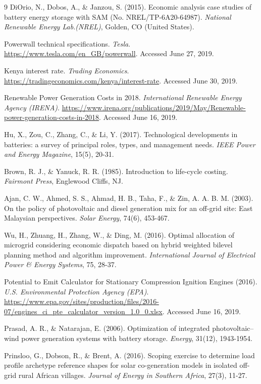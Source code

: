 \documentclass[final,3p,times]{elsarticle}
\begin{document}
\begin{thebibliography}{9}
DiOrio, N., Dobos, A., \& Janzou, S. (2015). Economic analysis case studies of battery energy storage with SAM (No. NREL/TP-6A20-64987). \textit{National Renewable Energy Lab.(NREL)}, Golden, CO (United States).

Powerwall technical specifications. \textit{Tesla}. \url{https://www.tesla.com/en_GB/powerwall}. Accessed June 27, 2019.

Kenya interest rate. \textit{Trading Economics}. \url{https://tradingeconomics.com/kenya/interest-rate}. Accessed June 30, 2019.

Renewable Power Generation Costs in 2018. \textit{International Renewable Energy Agency (IRENA)}. \url{https://www.irena.org/publications/2019/May/Renewable-power-generation-costs-in-2018}. Accessed June 16, 2019.

Hu, X., Zou, C., Zhang, C., \& Li, Y. (2017). Technological developments in batteries: a survey of principal roles, types, and management needs. \textit{IEEE Power and Energy Magazine}, 15(5), 20-31.

Brown, R. J., \& Yanuck, R. R. (1985). Introduction to life-cycle costing. \textit{Fairmont Press}, Englewood Cliffs, NJ.

Ajan, C. W., Ahmed, S. S., Ahmad, H. B., Taha, F., \& Zin, A. A. B. M. (2003). On the policy of photovoltaic and diesel generation mix for an off-grid site: East Malaysian perspectives. \textit{Solar Energy}, 74(6), 453-467.

Wu, H., Zhuang, H., Zhang, W., \& Ding, M. (2016). Optimal allocation of microgrid considering economic dispatch based on hybrid weighted bilevel planning method and algorithm improvement. \textit{International Journal of Electrical Power \& Energy Systems}, 75, 28-37.

Potential to Emit Calculator for Stationary Compression Ignition Engines (2016). \textit{U.S. Environmental Protection Agency (EPA)}.
\url{https://www.epa.gov/sites/production/files/2016-07/engines_ci_pte_calculator_version_1.0_0.xlsx}. Accessed June 16, 2019.

Prasad, A. R., \& Natarajan, E. (2006). Optimization of integrated photovoltaic–wind power generation systems with battery storage. \textit{Energy}, 31(12), 1943-1954.

Prinsloo, G., Dobson, R., \& Brent, A. (2016). Scoping exercise to determine load profile archetype reference shapes for solar co-generation models in isolated off-grid rural African villages. \textit{Journal of Energy in Southern Africa}, 27(3), 11-27.


\end{thebibliography}
\end{document}
